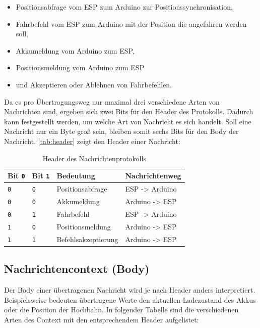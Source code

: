 \begin{itemize}
	\item Positionsabfrage vom ESP zum Arduino zur Positionssynchronisation,
	\item Fahrbefehl vom ESP zum Arduino mit der Position die angefahren werden soll,
	\item Akkumeldung vom Arduino zum ESP,
	\item Positionsmeldung vom Arduino zum ESP
	\item und Akzeptieren oder Ablehnen von Fahrbefehlen.
\end{itemize}

Da es pro Übertragungsweg nur maximal drei verschiedene Arten von Nachrichten sind, ergeben sich zwei Bits für den Header des Protokolls. Dadurch kann festgestellt werden, um welche Art von Nachricht es sich handelt.
Soll eine Nachricht nur ein Byte groß sein, bleiben somit sechs Bits für den Body der Nachricht. 
\autoref{tab:header} zeigt den Header einer Nachricht:
\begin{table}[h]
	\begin{center}
		\begin{tabular}{m{2cm} | m{2cm} | m{5cm} | m{5cm}}
			Bit \texttt{0} & Bit \texttt{1} & Bedeutung & Nachrichtenweg\\
			\hline 
			\texttt{0} & \texttt{0} & Positionsabfrage  & ESP      ->  Arduino\\
			\hline 
			\texttt{0} & \texttt{0} & Akkumeldung & Arduino  ->      ESP\\
			\hline 
			\texttt{0} & \texttt{1} & Fahrbefehl & ESP      ->  Arduino\\
			\hline 
			\texttt{1} & \texttt{0} & Positionsmeldung & Arduino  ->      ESP\\
			\hline 
			\texttt{1} & \texttt{1} & Befehlsakzeptierung & Arduino  ->      ESP\\
		\end{tabular}
	\end{center}
	\caption{\label{tab:header}Header des Nachrichtenprotokolls}
\end{table}

\subsection{Nachrichtencontext (Body)}
Der Body einer übertragenen Nachricht wird je nach Header anders interpretiert. Beispielsweise bedeuten übertragene Werte den aktuellen Ladezustand des Akkus oder die Position der Hochbahn. 
In folgender Tabelle sind die verschiedenen Arten des Context mit den entsprechendem Header aufgelistet:

